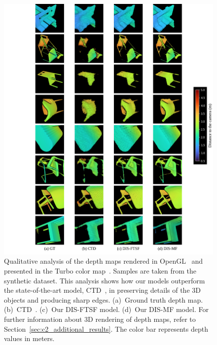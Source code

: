 \begin{figure}[t]
    \begin{center}
        \includegraphics[width=1.0\linewidth]{images/chapter2/supp_figures/rendered.jpg}
    \end{center}
   \caption{Qualitative analysis of the depth maps rendered in OpenGL~\cite{shreiner2013opengl} and presented in the Turbo color map~\cite{mikhailov2019turbo}. Samples are taken from the synthetic dataset. This analysis shows how our models outperform the state-of-the-art model, CTD~\cite{riegler2019connecting}, in preserving details of the 3D objects and producing sharp edges. (a)~Ground truth depth map. (b)~CTD~\cite{riegler2019connecting}. (c)~Our DIS-FTSF model. (d)~Our DIS-MF model. For further information about 3D rendering of depth maps, refer to Section~\ref{sec:c2_additional_results}. The color bar represents depth values in meters.}
    \label{fig:c2_rendered}
\end{figure}

